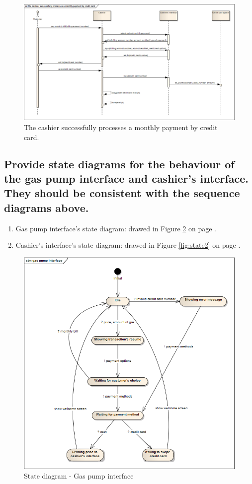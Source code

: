 \documentclass[11pt,a4paper]{article}
\begin{document}
\begin{figure}[H]
 \centering
 \includegraphics[width=\textwidth]{../sequence3.png} 
 \caption{The cashier successfully processes a monthly payment by credit card.}
 \label{fig:sequence3}
\end{figure}


\subsection*{Provide state diagrams for the behaviour of the gas pump interface and cashier’s interface. They should be consistent with the sequence diagrams above.}


\begin{enumerate}
	\item Gas pump interface's state diagram: drawed in Figure \ref{fig:state1} on page \pageref{fig:state1}.
	\item Cashier's interface's state diagram: drawed in Figure \ref{fig:state2} on page \pageref{fig:state2}.
\end{enumerate}

\begin{figure}[H]
 \centering
 \includegraphics[width=\textwidth]{../state-diagram-gas-pump-interface.png} 
 \caption{State diagram - Gas pump interface}
 \label{fig:state1}
\end{figure}
\end{document}
